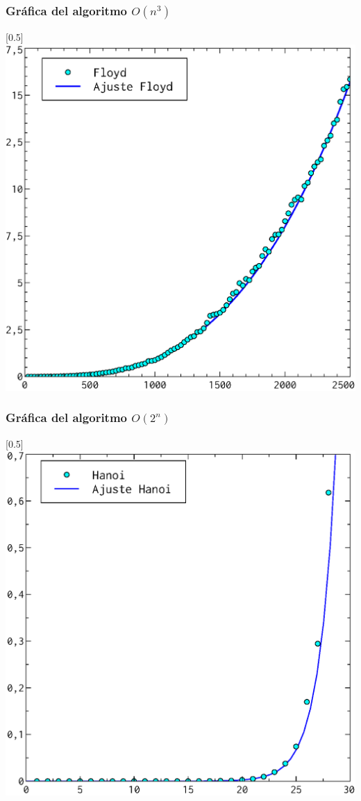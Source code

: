 \documentclass[compress]{beamer}
\begin{document}
\begin{frame}
\frametitle{Gráfica del algoritmo $O(n^3)$}
	\begin{center}
\scalebox{0.53}[0.5]{
    \includegraphics[]{n3_ajuste.eps}
}
	\end{center}
\end{frame}
\begin{frame}
\frametitle{Gráfica del algoritmo $O(2^n)$}
	\begin{center}
\scalebox{0.53}[0.5]{
    \includegraphics[]{2n_ajuste.eps}
}
\end{center}
\end{frame}
\end{document}
